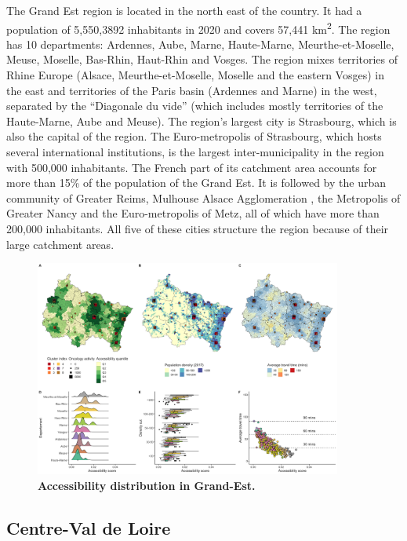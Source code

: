 The Grand Est region is located in the north east of the country. It had a population of 5,550,3892 inhabitants in 2020 and covers 57,441 km\textsuperscript{2}. The region has 10 departments: Ardennes, Aube, Marne, Haute-Marne, Meurthe-et-Moselle, Meuse, Moselle, Bas-Rhin, Haut-Rhin and Vosges.
The region mixes territories of Rhine Europe (Alsace, Meurthe-et-Moselle, Moselle and the eastern Vosges) in the east and territories of the Paris basin (Ardennes and Marne) in the west, separated by the ``Diagonale du vide'' (which includes mostly territories of the Haute-Marne, Aube and Meuse). The region's largest city is Strasbourg, which is also the capital of the region. The Euro-metropolis of Strasbourg, which hosts several international institutions, is the largest inter-municipality in the region with 500,000 inhabitants. The French part of its catchment area accounts for more than 15\% of the population of the Grand Est. It is followed by the urban community of Greater Reims, Mulhouse Alsace Agglomeration , the Metropolis of Greater Nancy and the Euro-metropolis of Metz, all of which have more than 200,000 inhabitants. All five of these cities structure the region because of their large catchment areas.

\begin{figure}[H]
    \includegraphics[width=0.9\textwidth]{images/camion/region_accessibility/accessibility_Grand-Est.png}
    \centering
    \caption{
        \textbf{Accessibility distribution in Grand-Est.}
    }
\end{figure}

\subsection*{Centre-Val de Loire}

